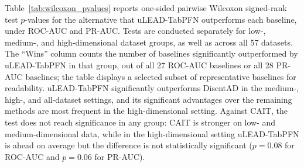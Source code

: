 \documentclass[conference]{IEEEtran}
\begin{document}
	Table~\ref{tab:wilcoxon_pvalues} reports one-sided pairwise Wilcoxon signed-rank test $p$-values for the alternative that uLEAD-TabPFN outperforms each baseline, under ROC-AUC and PR-AUC. Tests are conducted separately for low-, medium-, and high-dimensional dataset groups, as well as across all 57 datasets. The ``Wins'' column counts the number of baselines significantly outperformed by uLEAD-TabPFN in that group, out of all 27 ROC-AUC baselines or all 28 PR-AUC baselines; the table displays a selected subset of representative baselines for readability. uLEAD-TabPFN significantly outperforms DisentAD in the medium-, high-, and all-dataset settings, and its significant advantages over the remaining methods are most frequent in the high-dimensional setting. Against CAIT, the test does not reach significance in any group: CAIT is stronger on low- and medium-dimensional data, while in the high-dimensional setting uLEAD-TabPFN is ahead on average but the difference is not statistically significant ($p{=}0.08$ for ROC-AUC and $p{=}0.06$ for PR-AUC).
	
\end{document}

